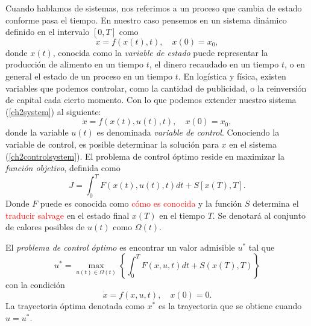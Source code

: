     Cuando hablamos de sistemas, nos referimos a un proceso que cambia de estado conforme pasa el tiempo. En nuestro caso pensemos en un sistema dinámico definido en el intervalo $[0, T]$ como
    \begin{equation}
        \label{ch2system}
        \dot x =f(x(t),t), \quad x(0) = x_0,  
    \end{equation}
    donde $x(t)$, conocida como la \textsl{variable de estado} puede representar la producción de alimento en un tiempo $t$, el dinero recaudado en un tiempo $t$, o en general el estado de un proceso en un tiempo $t$. En logística y física, existen variables que podemos controlar, como la cantidad de publicidad, o la reinversión de capital cada cierto momento. Con lo que podemos extender nuestro sistema  (\ref{ch2system}) al siguiente:
    \begin{equation}
        \label{ch2controlsystem}
        \dot x = f(x(t),u(t),t), \quad x(0) = x_0,
    \end{equation}
    donde la variable $u(t)$ es denominada \textsl{variable de control}. Conociendo la variable de control, es posible determinar la solución para $x$ en el sistema (\ref{ch2controlsystem}). El problema de control óptimo reside en maximizar la \textsl{función objetivo}, definida como
    \begin{equation}
        J = \int_0^T F(x(t), u(t), t)dt + S[x(T), T].
    \end{equation}
    Donde $F$ puede es conocida como \textcolor{red}{cómo es conocida} y la función $S$ determina el \textcolor{red}{traducir salvage} en el estado final $x(T)$ en el tiempo $T$. Se denotará al conjunto de calores posibles de $u(t)$ como $\Omega(t)$.

    \begin{definition}
        El \textsl{problema de control óptimo} es encontrar un valor admisible $u^*$ tal que 
        \begin{equation}
            \label{ch2umax}
            u^* = \max_{u(t)\in \Omega(t)}\left\{\int_0^T F(x, u, t)dt + S(x(T), T)\right\}
        \end{equation}
        con la condición 
        \begin{equation}
            \label{ch2dynamicCondition}
            \dot x = f(x,u,t), \quad x(0) = 0.
        \end{equation}
        La trayectoria óptima denotada como $x^*$ es la trayectoria que se obtiene cuando $u = u^*$.
    \end{definition}

